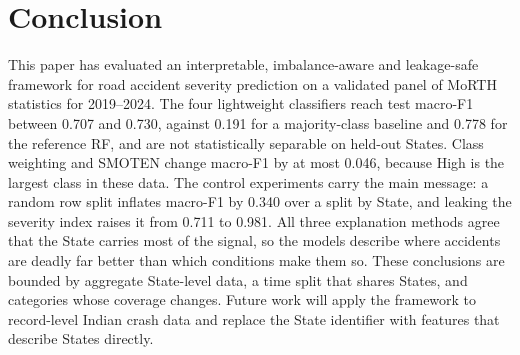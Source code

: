 \documentclass[conference]{IEEEtran}
\begin{document}
\section{Conclusion}
\label{sec:conclusion}

This paper has evaluated an interpretable, imbalance-aware and leakage-safe framework for road accident severity prediction on a validated panel of MoRTH statistics for 2019--2024. The four lightweight classifiers reach test macro-F1 between 0.707 and 0.730, against 0.191 for a majority-class baseline and 0.778 for the reference RF, and are not statistically separable on held-out States. Class weighting and SMOTEN change macro-F1 by at most 0.046, because High is the largest class in these data. The control experiments carry the main message: a random row split inflates macro-F1 by 0.340 over a split by State, and leaking the severity index raises it from 0.711 to 0.981. All three explanation methods agree that the State carries most of the signal, so the models describe where accidents are deadly far better than which conditions make them so. These conclusions are bounded by aggregate State-level data, a time split that shares States, and categories whose coverage changes. Future work will apply the framework to record-level Indian crash data and replace the State identifier with features that describe States directly.
\end{document}
